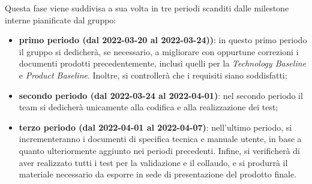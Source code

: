 Questa fase viene suddivisa a sua volta in tre periodi scanditi dalle milestone interne pianificate dal gruppo:
\begin{itemize}
\item \textbf{primo periodo (dal 2022-03-20 al 2022-03-24))}: in questo primo periodo il gruppo si dedicherà,  se necessario,  a migliorare con oppurtune correzioni i documenti prodotti precedentemente,  inclusi quelli per la \textit{Technology Baseline} e \textit{Product Baseline}.  Inoltre,  si controllerà che i requisiti siano soddisfatti;
\item \textbf{secondo periodo (dal 2022-03-24 al 2022-04-01)}: nel secondo periodo il team si dedicherà unicamente alla codifica e alla realizzazione dei test;
\item \textbf{terzo periodo (dal 2022-04-01 al 2022-04-07)}: nell'ultimo periodo,  si incrementeranno i documenti di specifica tecnica e manuale utente,  in base a quanto ulteriormente aggiunto nei periodi precedenti.  Infine,  si verificherà di aver realizzato tutti i test per la validazione e il collaudo,  e si produrrà il materiale necessario da esporre in sede di presentazione del prodotto finale.
\end{itemize}